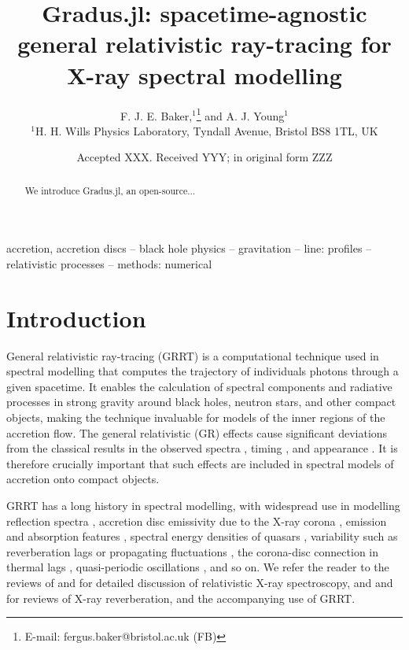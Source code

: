 \documentclass[fleqn,usenatbib]{mnras}
\title[Gradus.jl]{Gradus.jl: spacetime-agnostic general relativistic ray-tracing
for X-ray spectral modelling}
\author[F. J. E. Baker et al.]{
F. J. E. Baker,$^{1}$\thanks{E-mail: fergus.baker@bristol.ac.uk (FB)}
and A. J. Young$^{1}$
\\
$^{1}$H. H. Wills Physics Laboratory, Tyndall Avenue, Bristol BS8 1TL, UK
}
\date{Accepted XXX. Received YYY; in original form ZZZ}
\newcommand{\Gradus}{Gradus.jl\xspace}
\begin{document}
\label{firstpage}
\pagerange{\pageref{firstpage}--\pageref{lastpage}}
\maketitle
\begin{abstract}
    We introduce \Gradus, an open-source...
\end{abstract}

\begin{keywords}
accretion, accretion discs -- black hole physics -- gravitation -- line: profiles -- relativistic processes -- methods: numerical
\end{keywords}



\section{Introduction}

General relativistic ray-tracing (GRRT) is a computational technique used in
spectral modelling that computes the trajectory of individuals photons through a
given spacetime. It enables the calculation of spectral components and radiative
processes in strong gravity around black holes, neutron stars, and other compact
objects, making the technique invaluable for models of the inner regions of the
accretion flow. The general relativistic (GR) effects cause significant
deviations from the classical results in the observed spectra
\citep[e.g.][]{cunningham_optical_1973, fabian_long_2002}, timing
\citep[e.g.][]{stella_measuring_1990, reynolds_x-ray_1999}, and appearance
\citep[e.g.][]{luminet_image_1979}. It is therefore crucially important that
such effects are included in spectral models of accretion onto compact objects.

GRRT has a long history in spectral modelling, with widespread use in modelling
reflection spectra \citep[e.g.][]{fabian_x-ray_1989}, accretion disc emissivity
due to the X-ray corona \citep[e.g.][]{wilkins_understanding_2012,
wilkins_towards_2016}, emission and absorption features
\citep[e.g.][]{ruszkowski_absorption_2002}, spectral energy densities of quasars
\citep[e.g.][]{hagen_estimating_2023}, variability such as reverberation lags or
propagating fluctuations
\citep[e.g.][]{ingram_public_2019}, the corona-disc connection in thermal lags
\citep[e.g.][]{kammoun_hard_2019}, quasi-periodic oscillations \citep[QPOs,
e.g.][]{tsang_iron_2013}, and so on.  We refer the reader to the reviews of
\citet{reynolds_iron_lines_2003} and \citet{reynolds_observational_2021} for
detailed discussion of relativistic X-ray spectroscopy, and
\citet{uttley_x-ray_2014} and \citet{cackett_reverberation_2021} for reviews of
X-ray reverberation, and the accompanying use of GRRT.
\end{document}
